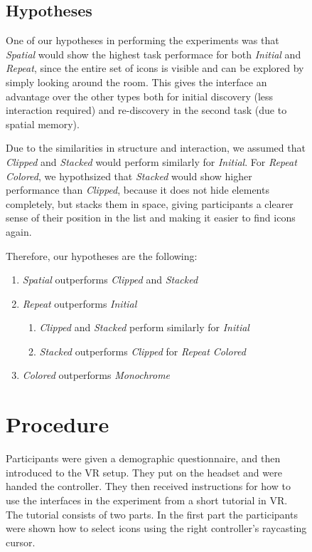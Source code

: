 \documentclass{tufte-book} %
\begin{document}
\begin{figure}
\subsection{Hypotheses}
One of our hypotheses in performing the experiments was that \emph{Spatial} would show the highest task performace for both \emph{Initial} and \emph{Repeat}, since the entire set of icons is visible and can be explored by simply looking around the room. This gives the interface an advantage over the other types both for initial discovery (less interaction required) and re-discovery in the second task (due to spatial memory).

Due to the similarities in structure and interaction, we assumed that \emph{Clipped} and \emph{Stacked} would perform similarly for \emph{Initial}.
For \emph{Repeat Colored}, we hypothsized that \emph{Stacked} would show higher performance than \emph{Clipped}, because it does not hide elements completely, but stacks them in space, giving participants a clearer sense of their position in the list and making it easier to find icons again.

Therefore, our hypotheses are the following:

\begin{enumerate}[label=H\arabic*. , wide=0.5em,  leftmargin=*]
  \item \emph{Spatial} outperforms \emph{Clipped} and \emph{Stacked}
  \item \emph{Repeat} outperforms \emph{Initial}
  \begin{enumerate}[label=H2.\arabic*. , wide=0.5em,  leftmargin=*]
    \item \emph{Clipped} and \emph{Stacked} perform similarly for \emph{Initial}
    \item \emph{Stacked} outperforms \emph{Clipped} for \emph{Repeat Colored}
  \end{enumerate}
  \item \emph{Colored} outperforms \emph{Monochrome}
\end{enumerate}

\section{Procedure}
Participants were given a demographic questionnaire, and then introduced to the VR setup. They put on the headset and were handed the controller. They then received instructions for how to use the interfaces in the experiment from a short tutorial in VR. The tutorial consists of two parts.
In the first part the participants were shown how to select icons using the right controller's raycasting cursor.


\end{figure}
\end{document}

